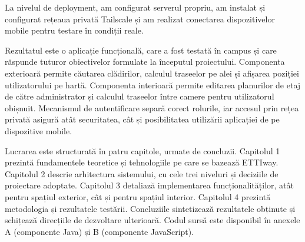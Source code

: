 ﻿\documentclass[12pt, a4paper, twoside, romanian]{teza-upb}
\begin{document}
La nivelul de deployment, am configurat serverul propriu, am instalat și
configurat rețeaua privată Tailscale și am realizat conectarea
dispozitivelor mobile pentru testare în condiții reale.
 
Rezultatul este o aplicație funcțională, care a fost testată în campus și
care răspunde tuturor obiectivelor formulate la începutul proiectului.
Componenta exterioară permite căutarea clădirilor, calculul traseelor pe
alei și afișarea poziției utilizatorului pe hartă. Componenta interioară
permite editarea planurilor de etaj de către administrator și calculul
traseelor între camere pentru utilizatorul obișnuit. Mecanismul de
autentificare separă corect rolurile, iar accesul prin rețea privată
asigură atât securitatea, cât și posibilitatea utilizării aplicației de
pe dispozitive mobile.
 
Lucrarea este structurată în patru capitole, urmate de concluzii. Capitolul 1
prezintă fundamentele teoretice și tehnologiile pe care se bazează ETTIway.
Capitolul 2 descrie arhitectura sistemului, cu cele trei niveluri și
deciziile de proiectare adoptate. Capitolul 3 detaliază implementarea
funcționalităților, atât pentru spațiul exterior, cât și pentru spațiul
interior. Capitolul 4 prezintă metodologia și rezultatele testării.
Concluziile sintetizează rezultatele obținute și schițează direcțiile de
dezvoltare ulterioară. Codul sursă este disponibil în anexele A
(componente Java) și B (componente JavaScript).






\clearpage
\thispagestyle{empty}
\mbox{}
\clearpage

\clearpage
\thispagestyle{empty}
\mbox{}
\clearpage




\clearpage
\thispagestyle{empty}
\mbox{}
\clearpage


\clearpage
\thispagestyle{empty}
\mbox{}
\clearpage
\end{document}
